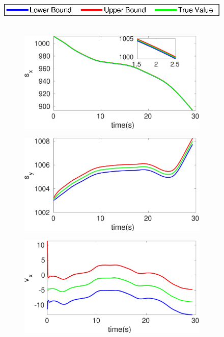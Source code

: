 \begin{figure}[h]
\hspace*{\fill} \includegraphics[scale=0.8]{figures/legend}\\\\
\begin{subfigure}{.5\linewidth}
\centering
\includegraphics[width=\linewidth]{figures/Frad/s3pmSMs_x}
\end{subfigure}
\begin{subfigure}{.5\linewidth}
\centering
\includegraphics[width=\linewidth]{figures/Frad/s3pmSMs_y}
\end{subfigure}
\begin{subfigure}{.5\linewidth}
\centering
\includegraphics[width=\linewidth]{figures/Frad/s3pmSMv_x}

\end{subfigure}
\end{figure}
